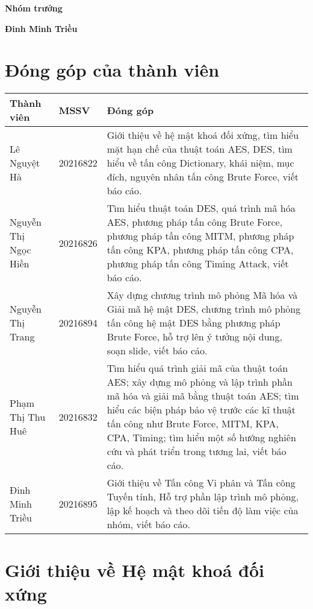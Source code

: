 \documentclass[12pt]{article}
\begin{document}
    
    \hspace{10cm} \textbf{Nhóm trưởng}
    
    \vspace{20pt}
    \hspace{9.7cm} \textbf{Đinh Minh Triều}
\newpage
\setlength{\leftmargin}{-0.5mm}\tableofcontents

\section*{Đóng góp của thành viên}
\begin{tabular}{|p{3cm}|p{2cm}|p{11cm}|}
    \hline
    Thành viên & MSSV & Đóng góp\\ \hline
    Lê Nguyệt Hà & 20216822 & Giới thiệu về hệ mật khoá đối xứng, tìm hiểu mặt hạn chế của thuật toán AES, DES, tìm hiểu về tấn công Dictionary, khái niệm, mục đích, nguyên nhân tấn công Brute Force, viết báo cáo.\\ \hline
    Nguyễn Thị Ngọc Hiền & 20216826 & Tìm hiểu thuật toán DES, quá trình mã hóa AES, phương pháp tấn công Brute Force, phương pháp tấn công MITM, phương pháp tấn công KPA, phương pháp tấn công CPA, phương pháp tấn công Timing Attack, viết báo cáo.\\ \hline
   Nguyễn Thị Trang & 20216894 & Xây dựng chương trình mô phỏng Mã hóa và Giải mã hệ mật DES, chương trình mô phỏng tấn công hệ mật DES bằng phương pháp Brute Force, hỗ trợ lên ý tưởng nội dung, soạn slide, viết báo cáo. \\ \hline
    Phạm Thị Thu Huê & 20216832 & Tìm hiểu quá trình giải mã của thuật toán AES; xây dựng mô phỏng và lập trình phần mã hóa và giải mã bằng thuật toán AES; tìm hiểu các biện pháp bảo vệ trước các kĩ thuật tấn công như Brute Force, MITM, KPA, CPA, Timing; tìm hiểu một số hướng nghiên cứu và phát triển trong tương lai, viết báo cáo. \\ \hline
    Đinh Minh Triều & 20216895  & Giới thiệu về Tấn công Vi phân và Tấn công Tuyến tính, Hỗ trợ phần lập trình mô phỏng, lập kế hoạch và theo dõi tiến độ làm việc của nhóm, viết báo cáo.  \\
    \hline
\end{tabular}

\section{Giới thiệu về Hệ mật khoá đối xứng}

\end{document}
